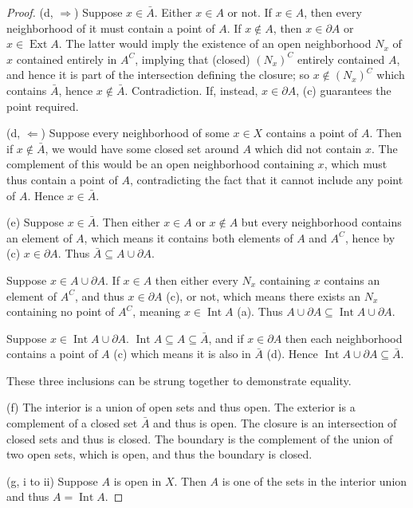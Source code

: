 \documentclass{article}
\theoremstyle{definition}
\begin{document}
\begin{proof}
(d, $\Rightarrow$)
Suppose $x \in \bar{A}$. Either $x \in A$ or not. If $x \in A$, then every
neighborhood of it must contain a point of $A$. If $x \not\in A$, then
$x \in \partial A$ or $x \in \operatorname{Ext} A$. The latter would imply
the existence of an open neighborhood $N_x$ of $x$ contained entirely in $A^C$,
implying that (closed) $(N_x)^C$ entirely contained $A$, and hence it is 
part of the intersection defining the closure; so $x \not\in (N_x)^C$ which
contains $\bar{A}$, hence $x \not\in \bar{A}$. Contradiction. If, instead,
$x \in \partial A$, (c) guarantees the point required.

(d, $\Leftarrow$)
Suppose every neighborhood of some $x \in X$ contains a point of $A$. Then
if $x \not\in \bar{A}$, we would have some closed set around $A$ which
did not contain $x$. The complement of this would be an open neighborhood
containing $x$, which must thus contain a point of $A$, contradicting
the fact that it cannot include any point of $A$. Hence $x \in\bar{A}$.

(e)
Suppose $x \in \bar{A}$. Then either $x \in A$ or $x \not\in A$ but every
neighborhood contains an element of $A$, which means it contains both elements
of $A$ and $A^C$, hence by (c) $x \in \partial A$. Thus 
$\bar{A} \subseteq A \cup \partial A$.

Suppose $x \in A \cup \partial A$. If $x \in A$ then either every $N_x$ 
containing $x$ contains an element of $A^C$, and thus $x \in \partial A$ (c),
or not, which means there exists an $N_x$ containing no point of $A^C$, meaning
$x \in \operatorname{Int} A$ (a). Thus 
$A \cup \partial A \subseteq \operatorname{Int} A \cup \partial A$.

Suppose $x \in \operatorname{Int} A \cup \partial A$. 
$\operatorname{Int} A \subseteq A \subseteq \bar A$, and if $x \in \partial A$
then each neighborhood contains a point of $A$ (c) which means it is also 
in $\bar{A}$ (d). Hence $\operatorname{Int} A \cup \partial A \subseteq \bar{A}$.

These three inclusions can be strung together to demonstrate equality.

(f)
The interior is a union of open sets and thus open.
The exterior is a complement of a closed set $\bar{A}$ and thus is open.
The closure is an intersection of closed sets and thus is closed.
The boundary is the complement of the union of two open sets, which is open,
and thus the boundary is closed.

(g, i to ii)
Suppose $A$ is open in $X$. Then $A$ is one of the sets in the interior union and thus
$A = \operatorname{Int} A$.


\end{proof}
\end{document}

